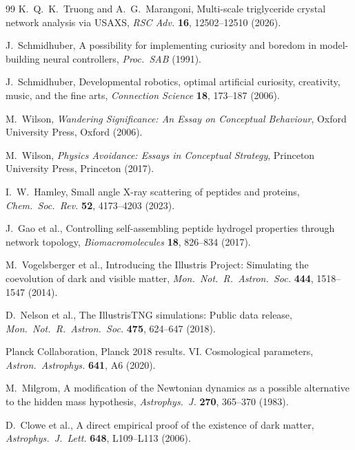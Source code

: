 \documentclass[11pt, a4paper, twocolumn]{article}
\begin{document}
{\begin{thebibliography}{99}
K.~Q.~K.~Truong and A.~G.~Marangoni,
\newblock Multi-scale triglyceride crystal network analysis via USAXS,
\newblock \emph{RSC Adv.} \textbf{16}, 12502--12510 (2026).

J.~Schmidhuber,
\newblock A possibility for implementing curiosity and boredom in model-building
neural controllers,
\newblock \emph{Proc.\ SAB} (1991).

J.~Schmidhuber,
\newblock Developmental robotics, optimal artificial curiosity, creativity,
music, and the fine arts,
\newblock \emph{Connection Science} \textbf{18}, 173--187 (2006).

M.~Wilson,
\newblock \textit{Wandering Significance: An Essay on Conceptual Behaviour},
\newblock Oxford University Press, Oxford (2006).

M.~Wilson,
\newblock \textit{Physics Avoidance: Essays in Conceptual Strategy},
\newblock Princeton University Press, Princeton (2017).

I.~W.~Hamley,
\newblock Small angle X-ray scattering of peptides and proteins,
\newblock \emph{Chem.\ Soc.\ Rev.} \textbf{52}, 4173--4203 (2023).

J.~Gao et al.,
\newblock Controlling self-assembling peptide hydrogel properties through
network topology,
\newblock \emph{Biomacromolecules} \textbf{18}, 826--834 (2017).

M.~Vogelsberger et al.,
\newblock Introducing the Illustris Project: Simulating the coevolution of dark
and visible matter,
\newblock \emph{Mon.\ Not.\ R.\ Astron.\ Soc.} \textbf{444}, 1518--1547 (2014).

D.~Nelson et al.,
\newblock The IllustrisTNG simulations: Public data release,
\newblock \emph{Mon.\ Not.\ R.\ Astron.\ Soc.} \textbf{475}, 624--647 (2018).

Planck Collaboration,
\newblock Planck 2018 results. VI. Cosmological parameters,
\newblock \emph{Astron.\ Astrophys.} \textbf{641}, A6 (2020).

M.~Milgrom,
\newblock A modification of the Newtonian dynamics as a possible alternative to
the hidden mass hypothesis,
\newblock \emph{Astrophys.\ J.} \textbf{270}, 365--370 (1983).

D.~Clowe et al.,
\newblock A direct empirical proof of the existence of dark matter,
\newblock \emph{Astrophys.\ J.\ Lett.} \textbf{648}, L109--L113 (2006).


\end{thebibliography}}
\end{document}
